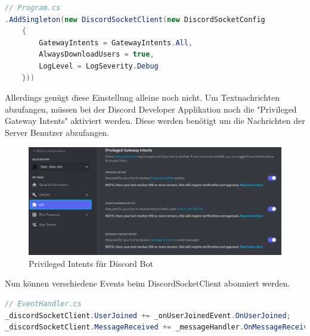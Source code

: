 \documentclass[a4paper, table]{article}
\begin{document}
\begin{lstlisting}[language=csharp]
// Program.cs
.AddSingleton(new DiscordSocketClient(new DiscordSocketConfig
    {
        GatewayIntents = GatewayIntents.All,
        AlwaysDownloadUsers = true,
        LogLevel = LogSeverity.Debug
    }))
\end{lstlisting}

Allerdings genügt diese Einstellung alleine noch nicht.
Um Textnachrichten abzufangen, müssen bei der Discord Developer Applikation noch die "Privileged Gateway Intents" aktiviert werden.
Diese werden benötigt um die Nachrichten der Server Benutzer abzufangen.

\begin{figure}[h]
    \centering
    \includegraphics[width=1\textwidth]{img/discord_developer_privileged_intents.png}
    \caption{Privileged Intents für Discord Bot}
    \label{fig:delevoper-privileged-intents}
\end{figure}

Nun können verschiedene Events beim DiscordSocketClient abonniert werden.

\begin{lstlisting}[language=csharp]
// EventHandler.cs
_discordSocketClient.UserJoined += _onUserJoinedEvent.OnUserJoined;
_discordSocketClient.MessageReceived += _messageHandler.OnMessageReceived;
\end{lstlisting}
\end{document}
